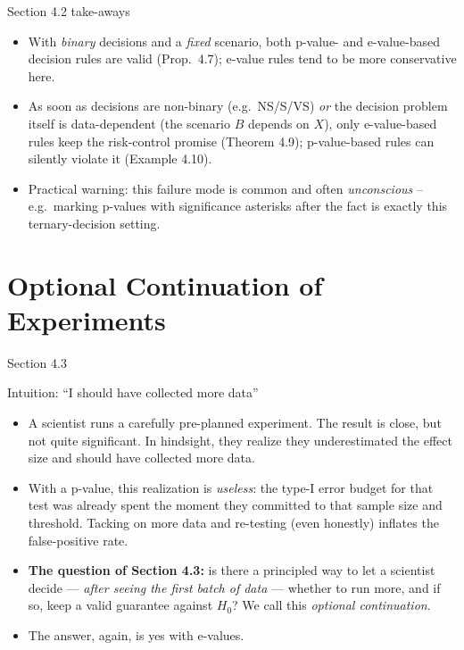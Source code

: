 \documentclass[aspectratio=169,10pt]{beamer}
\begin{document}
\begin{frame}{Section 4.2 take-aways}
  \begin{itemize}
    \item With \emph{binary} decisions and a \emph{fixed} scenario, both
    p-value- and e-value-based decision rules are valid (Prop.\ 4.7);
    e-value rules tend to be more conservative here.
    \item As soon as decisions are non-binary (e.g.\ NS/S/VS) \emph{or} the
    decision problem itself is data-dependent (the scenario $B$ depends on
    $X$), only e-value-based rules keep the risk-control promise
    (Theorem 4.9); p-value-based rules can silently violate it
    (Example 4.10).
    \item Practical warning: this failure mode is common and often
    \emph{unconscious} -- e.g.\ marking p-values with significance asterisks
    after the fact is exactly this ternary-decision setting.
  \end{itemize}
\end{frame}

\section{Optional Continuation of Experiments}

\begin{frame}{Section 4.3}
  \tableofcontents[currentsection]
\end{frame}

\begin{frame}{Intuition: ``I should have collected more data''}
  \begin{itemize}
    \item A scientist runs a carefully pre-planned experiment. The result is
    close, but not quite significant. In hindsight, they realize they
    underestimated the effect size and should have collected more data.
    \item With a p-value, this realization is \emph{useless}: the type-I
    error budget for that test was already spent the moment they committed
    to that sample size and threshold. Tacking on more data and re-testing
    (even honestly) inflates the false-positive rate.
    \item \textbf{The question of Section 4.3:} is there a principled way to
    let a scientist decide --- \emph{after seeing the first batch of data}
    --- whether to run more, and if so, keep a valid guarantee against
    $H_0$? We call this \emph{optional continuation}.
    \item The answer, again, is yes with e-values.
  \end{itemize}
\end{frame}
\end{document}
